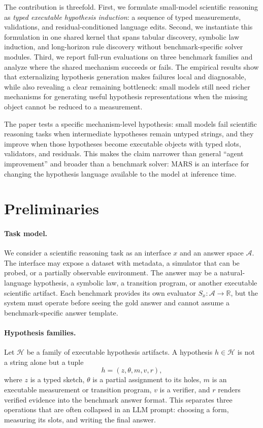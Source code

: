 \documentclass[letterpaper]{article}
\newcommand{\mars}{\textsc{MARS}\xspace}
\begin{document}
The contribution is threefold. First, we formulate small-model scientific
reasoning as \emph{typed executable hypothesis induction}: a sequence of typed
measurements, validations, and residual-conditioned language edits. Second, we
instantiate this formulation in one shared kernel that spans tabular discovery,
symbolic law induction, and long-horizon rule discovery without
benchmark-specific solver modules. Third, we report full-run evaluations on
three benchmark families and analyze where the shared mechanism succeeds or
fails. The empirical results show that externalizing hypothesis generation
makes failures local and diagnosable, while also revealing a clear remaining
bottleneck: small models still need richer mechanisms for generating useful
hypothesis representations when the missing object cannot be reduced to a
measurement.

The paper tests a specific mechanism-level hypothesis: small models fail
scientific reasoning tasks when intermediate hypotheses remain untyped strings,
and they improve when those hypotheses become executable objects with typed
slots, validators, and residuals. This makes the claim narrower than general
``agent improvement'' and broader than a benchmark solver: \mars is an
interface for changing the hypothesis language available to the model at
inference time.

\section{Preliminaries}

\paragraph{Task model.}
We consider a scientific reasoning task as an interface $x$ and an answer space
$\mathcal{A}$. The interface may expose a dataset with metadata, a simulator
that can be probed, or a partially observable environment.
The answer may be a natural-language hypothesis, a symbolic law, a transition
program, or another executable scientific artifact. Each benchmark provides
its own evaluator $S_x:\mathcal{A}\rightarrow\mathbb{R}$, but the system must operate before
seeing the gold answer and cannot assume a benchmark-specific answer template.

\paragraph{Hypothesis families.}
Let $\mathcal{H}$ be a family of executable hypothesis artifacts. A hypothesis
$h\in\mathcal{H}$ is not a string alone but a tuple
\begin{equation}
  h=(z,\theta,m,v,r),
\end{equation}
where $z$ is a typed sketch, $\theta$ is a partial assignment to its holes,
$m$ is an executable measurement or transition program, $v$ is a verifier, and
$r$ renders verified evidence into the benchmark answer format. This separates
three operations that are often collapsed in an LLM prompt: choosing a form,
measuring its slots, and writing the final answer.
\end{document}
